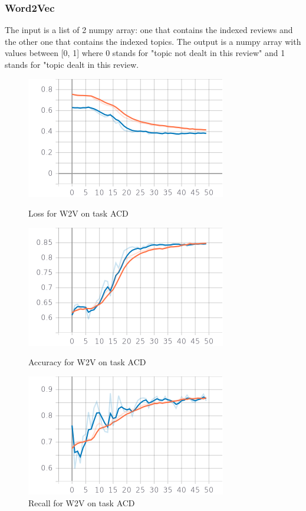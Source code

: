 \documentclass{article}
\begin{document}
            \subsubsection{Word2Vec}
                The input is a list of 2 numpy array: one that contains the indexed reviews and the other one that contains the indexed topics.
                The output is a numpy array with values between [0, 1] where 0 stands for "topic not dealt in this review" and 1 stands for "topic dealt in this review.
                \begin{figure}[!htb]
                \begin{minipage}{0.48\textwidth}
                    \centering
                    \includegraphics[width=.7\linewidth]{w2v_acd_epoch_loss.png}
                    \caption{Loss for W2V on task ACD}\label{Fig:Data7}
                \end{minipage}\hfill
                \begin{minipage}{0.48\textwidth}
                    \centering
                    \includegraphics[width=.7\linewidth]{w2v_acd_epoch_accuracy.png}
                    \caption{Accuracy for W2V on task ACD}\label{Fig:Data8}
                \end{minipage}
                \begin{minipage}{0.48\textwidth}
                    \centering
                    \includegraphics[width=.7\linewidth]{w2v_acd_epoch_recall.png}
                    \caption{Recall for W2V on task ACD}\label{Fig:Data9}
                \end{minipage}
            \end{figure}
\end{document}
